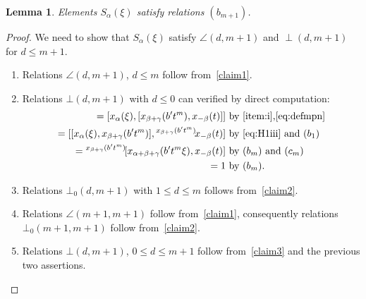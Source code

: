 \documentclass[oneside, 10pt]{amsart}
\newcommand{\rA}{\mathsf{A}}
\numberwithin{equation}{section}
\newtheorem{lemma}{Lemma}
\numberwithin{lemma}{section}
\theoremstyle{definition}
\theoremstyle{remark}
\begin{document}
\begin{lemma}
Elements $S_\alpha(\xi)$ satisfy relations $(b_{m+1})$.
 \end{lemma}
\begin{proof}
We need to show that $S_\alpha(\xi)$ satisfy $\angle(d, m+1)$ and $\perp(d, m+1)$ for $d\leq m+1$.
\begin{enumerate}
 \item Relations $\angle(d, m+1)$, $d\leq m$ follow from~\cref{claim1}. 
 \item Relations $\bot(d, m+1)$ with $d\leq 0$ can verified by direct computation:
 \begin{align*} 
 [x_\alpha(\xi), S_{\gamma}(bt^{m+1})] = [x_\alpha(\xi), [x_{\beta+\gamma}(b't^m), x_{-\beta}(t)]] & \text{ by~\eqref{item:i},\eqref{eq:defmpn}} \\
 = [[x_\alpha(\xi), x_{\beta+\gamma}(b't^m)], {}^{x_{\beta+\gamma}(b't^m)}\!x_{-\beta}(t)] &
 \text{ by \eqref{eq:H1iii} and $(b_1)$} \\
 = {}^{x_{\beta+\gamma}(b't^m)}\![x_{\alpha+\beta+\gamma}(b't^m\xi), x_{-\beta}(t)] &
 \text{ by $(b_m)$ and $(c_m)$} \\
 = 1 & \text{ by $(b_m)$.}
\end{align*}
 \item Relations $\bot_0(d, m+1)$ with $1\leq d\leq m$ follows from~\cref{claim2}.
 \item Relations $\angle(m+1, m+1)$ follow from~\cref{claim1}, consequently relations $\bot_0(m+1, m+1)$ follow from~\cref{claim2}.
 \item Relations $\bot(d, m+1)$, $0\leq d\leq m+1$ follow from~\cref{claim3} and the previous two assertions.
\end{enumerate}
\begin{comment}
 \begin{enumerate}
\item \label{case:1} First consider the case $d \leq 0$. There are two further subcases.
 \begin{enumerate}
  \item \label{case:1a} Case $\alpha \not \perp \alpha'$. 
  Without loss of generality we may assume that $\alpha' = \alpha + \beta$
  for some $\rA_3$-triple $(\alpha, \beta, \gamma)$.
  Using~\eqref{eq:H1iii} and~\eqref{eq:bm} we obtain
   \begin{multline} \nonumber
   [S_\alpha(\xi), S_{\alpha+\beta}(bt^{m+1})] = [x_\alpha(\xi), [x_{\alpha+\beta+\gamma}(b't^m), x_{-\gamma}(t)]] = \\   
  = [[x_\alpha(\xi), x_{\alpha+\beta+\gamma}(b't^m)], {}^{x_{\alpha+\beta+\gamma}(b't^m)}\!x_{-\gamma}(t)] = 1 \text{ for some $b'\in A$ }.

\end{comment}
\end{proof}
\end{document}
